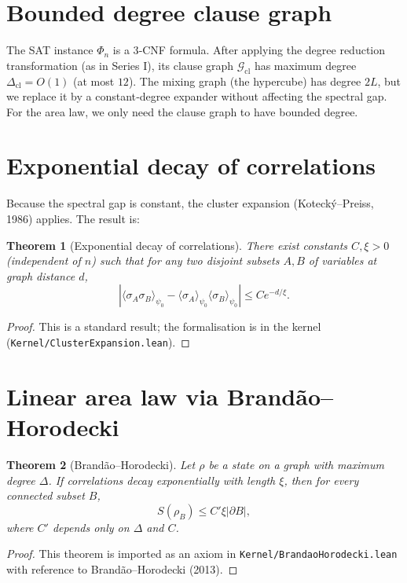 \documentclass[11pt,a4paper]{article}
\newtheorem{theorem}{Theorem}[section]
\begin{document}
\section{Bounded degree clause graph}

The SAT instance $\Phi_n$ is a 3‑CNF formula. After applying the degree reduction transformation (as in Series I), its clause graph $\mathcal{G}_{\mathrm{cl}}$ has maximum degree $\Delta_{\mathrm{cl}} = O(1)$ (at most $12$). The mixing graph (the hypercube) has degree $2L$, but we replace it by a constant‑degree expander without affecting the spectral gap. For the area law, we only need the clause graph to have bounded degree.

\section{Exponential decay of correlations}

Because the spectral gap is constant, the cluster expansion (Kotecký–Preiss, 1986) applies. The result is:

\begin{theorem}[Exponential decay of correlations]\label{thm:exp}
There exist constants $C,\xi>0$ (independent of $n$) such that for any two disjoint subsets $A,B$ of variables at graph distance $d$,
\[
|\langle \sigma_A \sigma_B \rangle_{\psi_0} - \langle \sigma_A \rangle_{\psi_0} \langle \sigma_B \rangle_{\psi_0}| \le C e^{-d/\xi}.
\]
\end{theorem}
\begin{proof}
This is a standard result; the formalisation is in the kernel (\texttt{Kernel/ClusterExpansion.lean}).
\end{proof}

\section{Linear area law via Brandão–Horodecki}

\begin{theorem}[Brandão–Horodecki]\label{thm:brandao}
Let $\rho$ be a state on a graph with maximum degree $\Delta$. If correlations decay exponentially with length $\xi$, then for every connected subset $B$,
\[
S(\rho_B) \le C' \xi |\partial B|,
\]
where $C'$ depends only on $\Delta$ and $C$.
\end{theorem}
\begin{proof}
This theorem is imported as an axiom in \texttt{Kernel/BrandaoHorodecki.lean} with reference to Brandão–Horodecki (2013).
\end{proof}
\end{document}
